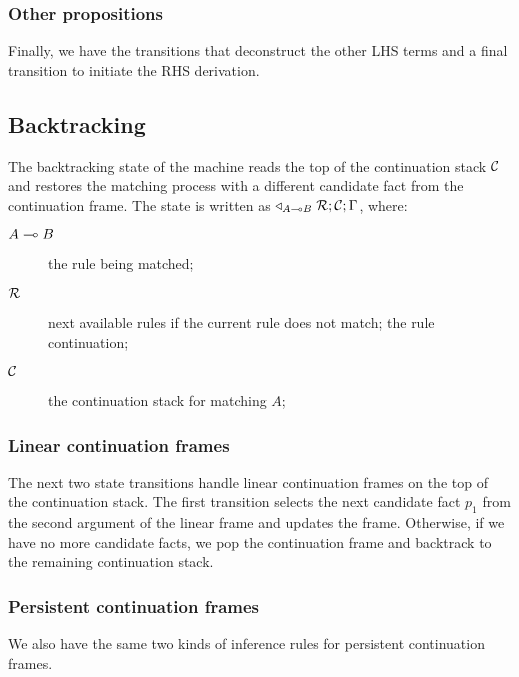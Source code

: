 \subsubsection{Other propositions}

Finally, we have the transitions that deconstruct the other LHS terms and a
final transition to initiate the RHS derivation.



\subsection{Backtracking}\label{sec:lld_match_cont}

The backtracking state of the machine reads the top of the continuation stack
$\mathcal{C}$ and restores the matching process with a different candidate fact
from the continuation frame. The state is written as $\triangleleft_{A \multimap
B} \; \mathcal{R}; \mathcal{C}; \Gamma$, where:

\begin{description}
   \item[$A \multimap B$] the rule being matched;
   \item[$\mathcal{R}$] next available rules if the current rule does not match;
   the rule continuation;
   \item[$\mathcal{C}$] the continuation stack for matching $A$;
\end{description}

\subsubsection{Linear continuation frames}

The next two state transitions handle linear continuation frames on the top of the
continuation stack. The first transition selects the next candidate fact $p_1$ from the
second argument of the linear frame and updates the frame. Otherwise, if we have
no more candidate facts, we pop the continuation frame and backtrack to the
remaining continuation stack.



\subsubsection{Persistent continuation frames}

We also have the same two kinds of inference rules for persistent continuation
frames.

